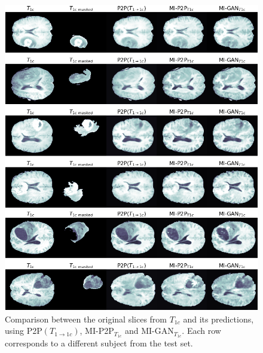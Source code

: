 \newpage
\begin{figure}[H]
\centering

\vspace{20mm}


\includegraphics[width=0.635\textheight]{images/gen_t1c.1.pdf}

\vspace{2mm} 

\includegraphics[width=0.635\textheight]{images/gen_t1c.2.pdf}
\caption[Qualitative results from the generation of $T_{1c}$]{Comparison between the original slices from $T_{1c}$ and its predictions, using P2P$(T_{1 \rightarrow 1c})$, MI-P2P{$_{T_{1c}}$} and MI-GAN{$_{T_{1c}}$}. Each row corresponds to a different subject from the test set.}
\label{fig:t1c_gen}
\end{figure}

